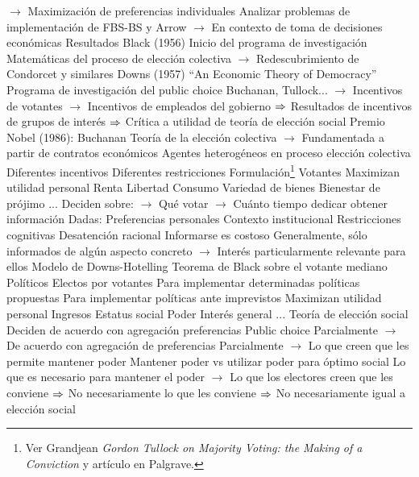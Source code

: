 \documentclass{nuevotema}
\begin{document}
\begin{esquemal}
				\4[] $\to$ Maximización de preferencias individuales
				\4 Analizar problemas de implementación de FBS-BS y Arrow
				\4[] $\to$ En contexto de toma de decisiones económicas
			\3 Resultados
				\4 Black (1956)
				\4[] Inicio del programa de investigación
				\4[] Matemáticas del proceso de elección colectiva
				\4[] $\to$ Redescubrimiento de Condorcet y similares
				\4 Downs (1957)
				\4[] ``An Economic Theory of Democracy''
				\4 Programa de investigación del public choice
				\4[] Buchanan, Tullock...
				\4[] $\to$ Incentivos de votantes
				\4[] $\to$ Incentivos de empleados del gobierno
				\4[] $\Rightarrow$ Resultados de incentivos de grupos de interés
				\4[] $\Rightarrow$ Crítica a utilidad de teoría de elección social
				\4 Premio Nobel (1986): Buchanan
				\4[] Teoría de la elección colectiva
				\4[] $\to$ Fundamentada a partir de contratos económicos
				\4 Agentes heterogéneos en proceso elección colectiva
				\4[] Diferentes incentivos
				\4[] Diferentes restricciones
		\2 Formulación\footnote{Ver Grandjean \textit{Gordon Tullock on Majority Voting: the Making of a Conviction} y artículo en Palgrave.}
			\3 Votantes
				\4 Maximizan utilidad personal
				\4[] Renta
				\4[] Libertad
				\4[] Consumo
				\4[] Variedad de bienes
				\4[] Bienestar de prójimo
				\4[] ...
				\4 Deciden sobre:
				\4[] $\to$ Qué votar
				\4[] $\to$ Cuánto tiempo dedicar obtener información
				\4 Dadas:
				\4[] Preferencias personales
				\4[] Contexto institucional
				\4[] Restricciones cognitivas
				\4 Desatención racional
				\4[] Informarse es costoso
				\4[] Generalmente, sólo informados de algún aspecto concreto
				\4[] $\to$ Interés particularmente relevante para ellos
				\4 Modelo de Downs-Hotelling
				\4 Teorema de Black sobre el votante mediano
			\3 Políticos
				\4 Electos por votantes
				\4[] Para implementar determinadas políticas propuestas
				\4[] Para implementar políticas ante imprevistos
				\4 Maximizan utilidad personal
				\4[] Ingresos
				\4[] Estatus social
				\4[] Poder
				\4[] Interés general
				\4[] ...
				\4 Teoría de elección social
				\4[] Deciden de acuerdo con agregación preferencias
				\4 Public choice
				\4[] Parcialmente
				\4[] $\to$ De acuerdo con agregación de preferencias
				\4[] Parcialmente
				\4[] $\to$ Lo que creen que les permite mantener poder
				\4 Mantener poder vs utilizar poder para óptimo social
				\4[] Lo que es necesario para mantener el poder
				\4[] $\to$ Lo que los electores creen que les conviene
				\4[] $\Rightarrow$ No necesariamente lo que les conviene
				\4[] $\Rightarrow$ No necesariamente igual a elección social

\end{esquemal}
\end{document}
